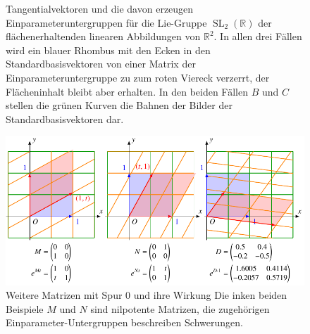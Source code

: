 \begin{beispiel}
\begin{figure}
\caption{Tangentialvektoren und die davon erzeugen Einparameteruntergruppen
für die Lie-Gruppe $\operatorname{SL}_2(\mathbb{R})$ der flächenerhaltenden
linearen Abbildungen von $\mathbb{R}^2$.
In allen drei Fällen wird ein blauer Rhombus mit den Ecken in den
Standardbasisvektoren von einer Matrix der Einparameteruntergruppe zu
zum roten Viereck verzerrt, der Flächeninhalt bleibt aber erhalten.
In den beiden Fällen $B$ und $C$ stellen die grünen Kurven die Bahnen
der Bilder der Standardbasisvektoren dar.
\label{buch:gruppen:fig:sl2}}
\end{figure}%
\begin{figure}
\centering
\includegraphics{chapters/60-gruppen/images/scherungen.pdf}
\caption{Weitere Matrizen mit Spur $0$ und ihre Wirkung 
Die inken beiden Beispiele $M$ und $N$ sind nilpotente Matrizen,
die zugehörigen Einparameter-Untergruppen beschreiben Schwerungen.
\label{buch:gruppen:fig:scherungen}}
\end{figure}
\end{beispiel}

%
%
